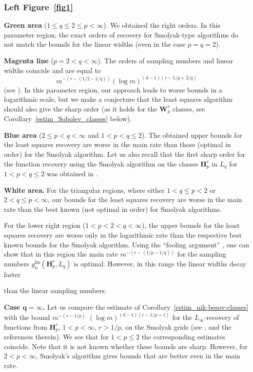 \documentclass[a4paper,12pt]{amsart}
\theoremstyle{definition}
\theoremstyle{remark}
\newcommand{\lin}{\ensuremath{\mathrm{lin}}}
\begin{document}
\subsubsection*{Left Figure~\ref{fig1}}
{
\medskip
{\bf Green area} ($1\leq q \leq 2\leq p
<\infty$).  We obtained the right orders. In this parameter region,
the exact orders of recovery
for Smolyak-type algorithms \cite[Thm.~5.1]{Dung_Ullrich2015} do not match the bounds for the linear widths (even in the case $p=q=2$). 

{\bf Magenta line} ($p=2<q<\infty$).  The orders of sampling numbers and linear widths coincide and are equal to 
$$m^{-(r-(1/2-1/q))} (\log m)^{(d-1)(r-1/p+2/q)}$$ (see \cite[Cor.\,~7.6]{Byrenheid_Ullrich2017}). 
In this parameter region, our approach leads to worse bounds in a logarithmic scale, but we make a conjecture that the least squares algorithm should also give the sharp order (as it holds for the $\mathbf{W}^r_p$ classes, see Corollary~\ref{estim_Sobolev_classes} below). 

{\bf Blue area} ($2\leq p<q < \infty$ and $1<p<q\leq 2$). The obtained upper bounds for the least squares recovery are worse in the main rate than those (optimal in order) for the Smolyak algorithm.
 {Let us also recall that} the first sharp order for the function recovery using the Smolyak algorithm on the classes $\mathbf{H}^r_p$ in $L_q$ for $1<p<q\leq 2$ was obtained
in \cite{DD91}. 

{\bf White area.} For the triangular regions, where either $1<q\leq p <2$ or $2<q\leq p < \infty$,  our bounds for the least squares recovery are worse in the main rate than the best known (not optimal in order) for Smolyak algorithms. 

For the lower right region ($1<p<2<q<\infty$),  the upper bounds for the least squares recovery are worse only in the logarithmic rate than the respective best known bounds for the Smolyak algorithm.
Using the ``fooling argument'' \cite[Cor.\,8.6]{Byrenheid_Ullrich2017}, one can show that in this region the
main rate $m^{-(r-(1/p-1/q))}$ for the sampling numbers $g_n^{\lin}(\mathbf{H}^r_p, L_q)$ is optimal. 
However, in this range the linear widths {decay faster} 

than the linear sampling numbers.

{\bf Case $\boldsymbol{q=\infty}$.}
    Let us compare the estimate of Corollary~\ref{estim_nik-besov-classes} with the
bound $m^{-(r-1/p)}$ $(\log m)^{(d-1)(r-1/p+1)}$ for  the 
{$L_\infty$}-recovery 
of functions from $\mathbf{H}^r_p$, $1<p<\infty$, $r>1/p$, on the Smolyak grids  (see \cite{DD91}, \cite[Thm.~5.3.3 (ii)]{DTU18}  and the references therein). 
We 
 {see that}
for $1<p\leq 2$ the 
corresponding estimates coincide. 
 {Note that}
it is not known whether these bounds are sharp. However, for $2<p<\infty$, Smolyak's algorithm gives bounds that are better even in the main rate.



}
\end{document}
